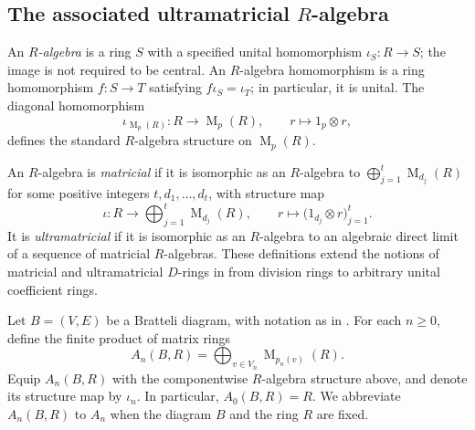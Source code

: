 \documentclass[11pt]{amsart}
\DeclareMathOperator{\Mat}{M}
\theoremstyle{definition}
\theoremstyle{remark}
\begin{document}
\subsection{The associated ultramatricial \texorpdfstring{$R$}{R}-algebra}
\label{subsec:associated-algebra}

An \emph{$R$-algebra} is a ring $S$ with a specified unital
homomorphism $\iota_S\colon R\to S$; the image is not required to be central.
An $R$-algebra homomorphism is a ring homomorphism $f\colon S\to T$
satisfying $f\iota_S=\iota_T$; in particular, it is unital.
The diagonal homomorphism
\[
 \iota_{\Mat_p(R)}\colon R\longrightarrow\Mat_p(R),\qquad
 r\longmapsto1_p\otimes r,
\]
defines the standard $R$-algebra structure on $\Mat_p(R)$.

An $R$-algebra is \emph{matricial} if it is isomorphic as an $R$-algebra to
$\bigoplus_{j=1}^t\Mat_{d_j}(R)$ for some positive integers
$t,d_1,\ldots,d_t$, with structure map
\[
 \iota\colon R\longrightarrow\bigoplus_{j=1}^t\Mat_{d_j}(R),
 \qquad r\longmapsto\bigl(1_{d_j}\otimes r\bigr)_{j=1}^t.
\]
It is \emph{ultramatricial} if it is isomorphic as an \(R\)-algebra to an
algebraic direct limit of a sequence of matricial \(R\)-algebras.
These definitions extend the notions of matricial and ultramatricial
$D$-rings in \cite[Section~3]{AraClaramunt2018} from division rings
to arbitrary unital coefficient rings.

Let $B=(V,E)$ be a Bratteli diagram, with notation as in
.  For each $n\geq0$, define the finite
product of matrix rings
\begin{equation}\label{eq:level-algebra}
 A_n(B,R)=\bigoplus_{v\in V_n}\Mat_{p_n(v)}(R).
\end{equation}
Equip $A_n(B,R)$ with the componentwise $R$-algebra structure above,
and denote its structure map by $\iota_n$.
In particular, $A_0(B,R)=R$.  We abbreviate $A_n(B,R)$ to $A_n$ when the
diagram \(B\) and the ring \(R\) are fixed.
\end{document}

